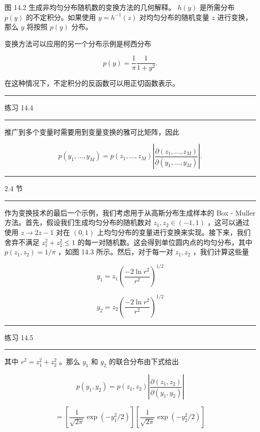 \documentclass[10pt]{report}
\newcommand{\HRule}{\begin{center}\rule{0.9\linewidth}{0.2mm}\end{center}}
\begin{document}
图 14.2 生成非均匀分布随机数的变换方法的几何解释。 \(h\left( y\right)\) 是所需分布 \(p\left( y\right)\) 的不定积分。如果使用 \(y = {h}^{-1}\left( z\right)\) 对均匀分布的随机变量 \(z\) 进行变换，那么 \(y\) 将按照 \(p\left( y\right)\) 分布。

变换方法可以应用的另一个分布示例是柯西分布

\[
p\left( y\right)  = \frac{1}{\pi }\frac{1}{1 + {y}^{2}}. \tag{14.8}
\]

在这种情况下，不定积分的反函数可以用正切函数表示。

\HRule

练习 14.4

\HRule

推广到多个变量时需要用到变量变换的雅可比矩阵，因此

\[
p\left( {{y}_{1},\ldots ,{y}_{M}}\right)  = p\left( {{z}_{1},\ldots ,{z}_{M}}\right) \left| \frac{\partial \left( {{z}_{1},\ldots ,{z}_{M}}\right) }{\partial \left( {{y}_{1},\ldots ,{y}_{M}}\right) }\right| . \tag{14.9}
\]

\HRule

2.4 节

\HRule

作为变换技术的最后一个示例，我们考虑用于从高斯分布生成样本的 Box - Muller 方法。首先，假设我们生成均匀分布的随机数对 \({z}_{1},{z}_{2} \in  \left( {-1,1}\right)\) ，这可以通过使用 \(z \rightarrow  {2z} - 1\) 对在 \(\left( {0,1}\right)\) 上均匀分布的变量进行变换来实现。接下来，我们舍弃不满足 \({z}_{1}^{2} + {z}_{2}^{2} \leq  1\) 的每一对随机数。这会得到单位圆内点的均匀分布，其中 \(p\left( {{z}_{1},{z}_{2}}\right)  = 1/\pi\) ，如图 14.3 所示。然后，对于每一对 \({z}_{1},{z}_{2}\) ，我们计算这些量

\[
{y}_{1} = {z}_{1}{\left( \frac{-2\ln {r}^{2}}{{r}^{2}}\right) }^{1/2} \tag{14.10}
\]

\[
{y}_{2} = {z}_{2}{\left( \frac{-2\ln {r}^{2}}{{r}^{2}}\right) }^{1/2} \tag{14.11}
\]

\HRule

练习 14.5

\HRule

其中 \({r}^{2} = {z}_{1}^{2} + {z}_{2}^{2}\) 。那么 \({y}_{1}\) 和 \({y}_{2}\) 的联合分布由下式给出

\[
p\left( {{y}_{1},{y}_{2}}\right)  = p\left( {{z}_{1},{z}_{2}}\right) \left| \frac{\partial \left( {{z}_{1},{z}_{2}}\right) }{\partial \left( {{y}_{1},{y}_{2}}\right) }\right|
\]

\[
= \left\lbrack  {\frac{1}{\sqrt{2\pi }}\exp \left( {-{y}_{1}^{2}/2}\right) }\right\rbrack  \left\lbrack  {\frac{1}{\sqrt{2\pi }}\exp \left( {-{y}_{2}^{2}/2}\right) }\right\rbrack   \tag{14.12}
\]
\end{document}
